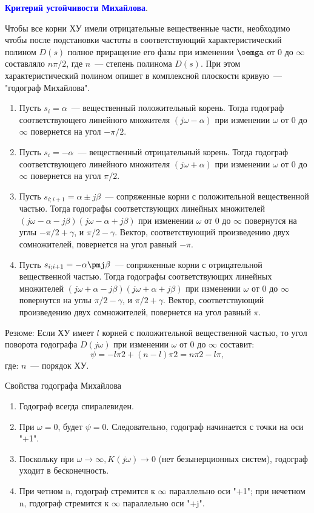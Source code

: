 \textcolor{blue}{\textbf{Критерий устойчивости Михайлова}}.

Чтобы все корни ХУ имели отрицательные вещественные части, необходимо чтобы после подстановки частоты в соответствующий характеристический полином $D(s)$ полное приращение его фазы при изменении $\oemga$ от $0$ до $\infty$ составляло $n \pi / 2$, где $n$~--- степень полинома $D(s)$. При этом характеристический полином опишет в комплексной плоскости кривую~--- "годограф Михайлова".

\begin{enumerate}
    \item Пусть $s_i=\alpha$~--- вещественный положительный корень. Тогда годограф соответствующего линейного множителя $(j\omega - \alpha)$ при изменении $\omega$ от 0 до $\infty$ повернется на угол $-\pi/2$.

    \item Пусть $s_i=-\alpha$~--- вещественный отрицательный корень. Тогда годограф соответствующего линейного множителя $(j\omega + \alpha)$ при изменении $\omega$ от 0 до $\infty$ повернется на угол $\pi/2$.

    \item Пусть $s_{i; i+1}= \alpha \pm j\beta$~--- сопряженные корни с положительной вещественной частью. Тогда годографы соответствующих линейных множителей $(j\omega−\alpha−j\beta)(j\omega−\alpha+j\beta)$ при изменении $\omega$ от 0 до $\infty$ повернутся на углы $-\pi/2+\gamma$, и $\pi/2-\gamma$. Вектор, соответствующий произведению двух сомножителей, повернется на угол равный $-\pi$.

    \item Пусть $s_{i; i+1}=-\alpha \pmj\beta$~--- сопряженные корни с отрицательной вещественной частью. Тогда годографы соответствующих линейных множителей $(j\omega+\alpha-j\beta)(j\omega+\alpha+j\beta)$ при изменении $\omega$ от 0 до $\infty$ повернутся на углы $\pi/2−\gamma$, и $\pi/2+\gamma$. Вектор, соответствующий произведению двух сомножителей, повернется на угол равный $\pi$.
\end{enumerate}


Резюме: Если ХУ имеет $l$ корней с положительной вещественной частью, то угол поворота годографа $D(j\omega)$ при изменении $\omega$ от 0 до $\infty$ составит:
\begin{equation}
    \psi= - l \pi 2+ (n-l) \pi 2=n \pi 2-l \pi,    
\end{equation}
где: $n$~--- порядок ХУ.

Свойства годографа Михайлова
\begin{enumerate}
    \item Годограф всегда спиралевиден.
    \item При $\omega=0$, будет $\psi=0$. Следовательно, годограф начинается с точки на оси "+1".
    \item Поскольку при $\omega\rightarrow\infty, K(j\omega)\rightarrow 0$ (нет безынерционных систем), годограф уходит в бесконечность.
    \item При четном n, годограф стремится к $\infty$ параллельно оси "+1"; при нечетном n, годограф стремится к $\infty$ параллельно оси "+j".
\end{enumerate}

